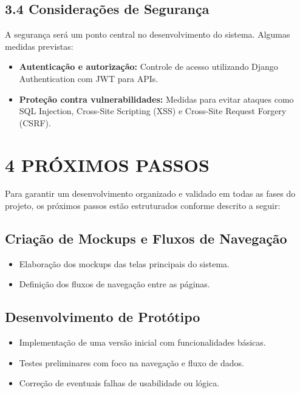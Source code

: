 \documentclass[12pt]{article}
\begin{document}
\subsection*{3.4 Considerações de Segurança}

A segurança será um ponto central no desenvolvimento do sistema. Algumas medidas previstas:
\begin{itemize}
\item \textbf{Autenticação e autorização:} Controle de acesso utilizando Django Authentication com JWT para APIs.
\item \textbf{Proteção contra vulnerabilidades:} Medidas para evitar ataques como SQL Injection, Cross-Site Scripting (XSS) e Cross-Site Request Forgery (CSRF).
\end{itemize}

\newpage

\section*{4 PRÓXIMOS PASSOS}
Para garantir um desenvolvimento organizado e validado em todas as fases do projeto, os próximos passos estão estruturados conforme descrito a seguir:

\subsection{Criação de Mockups e Fluxos de Navegação}
\begin{itemize}
    \item Elaboração dos mockups das telas principais do sistema.
    \item Definição dos fluxos de navegação entre as páginas.
\end{itemize}

\subsection{Desenvolvimento de Protótipo}
\begin{itemize}
    \item Implementação de uma versão inicial com funcionalidades básicas.
    \item Testes preliminares com foco na navegação e fluxo de dados.
    \item Correção de eventuais falhas de usabilidade ou lógica.
\end{itemize}
\end{document}
